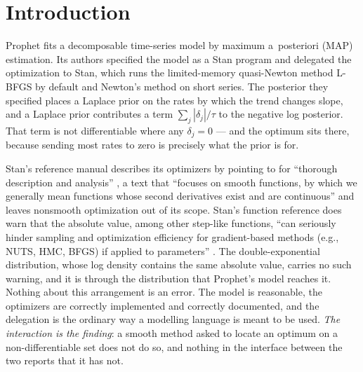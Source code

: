\section{Introduction}
\label{sec:introduction}

Prophet \citep{taylor2018forecasting} fits a decomposable time-series model by
maximum a~posteriori (MAP) estimation. Its authors specified the model as a Stan
program \citep{carpenter2017stan} and delegated the optimization to Stan, which
runs the limited-memory quasi-Newton method L-BFGS by default and Newton's method
on short series. The posterior they specified places a Laplace prior on the rates
by which the trend changes slope, and a Laplace prior contributes a term
$\sum_j |\delta_j|/\tau$ to the negative log posterior. That term is not
differentiable where any $\delta_j = 0$ --- and the optimum sits there, because
sending most rates to zero is precisely what the prior is for.

Stan's reference manual describes its optimizers by pointing to
\citet{nocedal2006numerical} for ``thorough description and analysis''
\citep{stan2025reference}, a text that ``focuses on smooth functions, by which we
generally mean functions whose second derivatives exist and are continuous'' and
leaves nonsmooth optimization out of its scope. Stan's function reference does warn
that the absolute value, among other step-like functions, ``can seriously hinder
sampling and optimization efficiency for gradient-based methods (e.g., NUTS, HMC,
BFGS) if applied to parameters'' \citep{stan2025functions}. The double-exponential
distribution, whose log density contains the same absolute value, carries no such
warning, and it is through the distribution that Prophet's model reaches it.
Nothing about this arrangement is an error.
The model is reasonable, the optimizers are correctly implemented and correctly
documented, and the delegation is the ordinary way a modelling language is meant
to be used. \emph{The interaction is the finding}: a smooth method asked to locate
an optimum on a non-differentiable set does not do so, and nothing in the
interface between the two reports that it has not.

